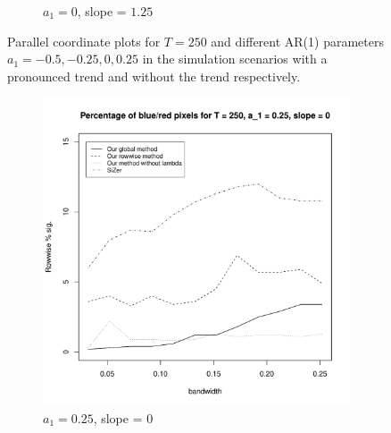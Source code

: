 \documentclass[a4paper,12pt]{article}
\begin{document}
\begin{figure}[t!]
\begin{subfigure}[b]{0.475\textwidth}
\caption{$a_1 = 0$, slope = $1.25$}
\end{subfigure}
\caption{Parallel coordinate plots for $T = 250$ and different AR(1) parameters $a_1 = -0.5, -0.25, 0, 0.25$ in the simulation scenarios with a pronounced trend and without the trend respectively.}\label{fig:PCP}
\end{figure}

\begin{figure}[t]
    \ContinuedFloat
\begin{subfigure}[b]{0.475\textwidth}
\includegraphics[width=\textwidth]{Plots/rowwise_sig_comparison_T_250_a1_25_slope_0.pdf}
\caption{$a_1 = 0.25$, slope = $0$}
\end{subfigure}\hspace{0.25cm}
\begin{subfigure}[b]{0.475\textwidth}

\end{subfigure}
\end{figure}
\end{document}
